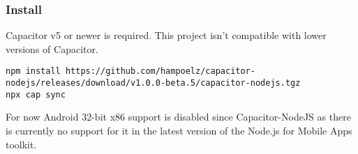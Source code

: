 \subsubsection{Install}
\label{sec:Capacitor-NodeJS:Install}

Capacitor v5 or newer is required. This project isn't compatible with lower versions of Capacitor.

\begin{verbatim}
npm install https://github.com/hampoelz/capacitor-nodejs/releases/download/v1.0.0-beta.5/capacitor-nodejs.tgz
npx cap sync
\end{verbatim}

\begin{note}[Note]
  For now Android 32-bit x86 support is disabled since Capacitor-NodeJS  as there is currently no support for it in the latest version of the Node.js for Mobile Apps toolkit.
  \cite{nodejs-mobile}
\end{note}
